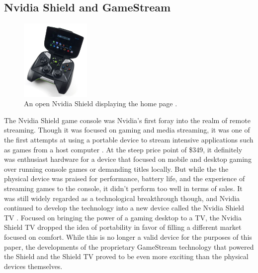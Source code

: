 \subsection{Nvidia Shield and GameStream}\label{subsec:NvidiaShieldAndGameStream}

\begin{figure}
  \centering
  \includegraphics[width=0.3\textwidth]{Figures/nvidia-shield-open-ifixit}
  \caption[Nvidia Shield]{An open Nvidia Shield displaying the home page \cite{ImageNvidiaShield}.}
  \label{fig:nvidiashield}
\end{figure}

The Nvidia Shield game console was Nvidia's first foray into the realm of remote streaming.
Though it was focused on gaming and media streaming, it was one of the first attempts at using a portable device to stream intensive applications such as games from a host computer \cite{brown_2013}.
At the steep price point of \$349, it definitely was enthusiast hardware for a device that focused on mobile and desktop gaming over running console games or demanding titles locally.
But while the the physical device was praised for performance, battery life, and the experience of streaming games to the console, it didn't perform too well in terms of sales.
It was still widely regarded as a technological breakthrough though, and Nvidia continued to develop the technology into a new device called the Nvidia Shield TV \cite{daniel_2017}.
Focused on bringing the power of a gaming desktop to a TV, the Nvidia Shield TV dropped the idea of portability in favor of filling a different market focused on comfort.
While this is no longer a valid device for the purposes of this paper, the developments of the proprietary GameStream technology that powered the Shield and the Shield TV proved to be even more exciting than the physical devices themselves.

